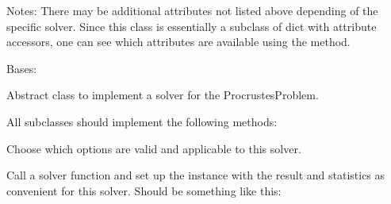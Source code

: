 \documentclass[a4paper,10pt,english]{sphinxmanual}
\begin{document}
\begin{fulllineitems}
\begin{itemize}
\begin{description}
\end{description}

\end{itemize}

Notes:
There may be additional attributes not listed above depending of the
specific solver. Since this class is essentially a subclass of dict
with attribute accessors, one can see which attributes are available
using the  method.

\end{fulllineitems}


\begin{fulllineitems}
\label{\detokenize{skprocrustes:skprocrustes.ProcrustesSolver}}
Bases: 

Abstract class to implement a solver for the ProcrustesProblem.

All subclasses should implement the following methods:

\begin{fulllineitems}
\label{\detokenize{skprocrustes:skprocrustes.ProcrustesSolver._setoptions}}
Choose which options are valid and applicable to this solver.

\end{fulllineitems}


\begin{fulllineitems}
\label{\detokenize{skprocrustes:skprocrustes.ProcrustesSolver.solve}}
Call a solver function and set up the  instance with
the result and statistics as convenient for this solver. Should be
something like this:

\begin{sphinxVerbatim}[commandchars=\\\{\}]
    
  
 
\end{sphinxVerbatim}

\end{fulllineitems}


\end{fulllineitems}
\end{document}
